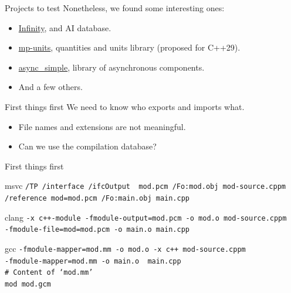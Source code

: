 \documentclass[aspectratio=169]{beamer}
\begin{document}
\begin{frame}{Projects to test}
  Nonetheless, we found some interesting ones:
  \begin{itemize}
    \item \href{https://github.com/infiniflow/infinity}{Infinity}, and AI database.
    \item \href{https://github.com/mpusz/mp-units}{mp-units}, quantities and units library (proposed for C++29).
    \item \href{https://github.com/alibaba/async_simple/tree/CXX20Modules}{async\_simple}, library of asynchronous components.
    \item And a few others.
  \end{itemize}
\end{frame}

\begin{frame}{First things first}
  We need to know who exports and imports what.
  \begin{itemize}
    \item File names and extensions are not meaningful.
    \item Can we use the compilation database?
  \end{itemize}
\end{frame}

\begin{frame}{First things first}
  \begin{block}{msvc }
    \footnotesize{
    \texttt{/TP /interface /ifcOutput {\color{red} mod.pcm} /Fo:mod.obj {\color{blue}mod-source.cppm}} \\
    \texttt{/reference {\color{purple}mod=mod.pcm} /Fo:main.obj {\color{blue}main.cpp}}
    }
  \end{block}
  \begin{block}{clang }
    \footnotesize{
    \texttt{-x c++-module -fmodule-output={\color{red}mod.pcm} -o mod.o {\color{blue}mod-source.cppm}} \\
    \texttt{-fmodule-file={\color{purple}mod=mod.pcm} -o main.o {\color{blue}main.cpp}}
    }
  \end{block}
  \begin{block}{gcc }
    \footnotesize{
    \texttt{-fmodule-mapper={\color{magenta}mod.mm} -o mod.o -x c++ {\color{blue}mod-source.cppm}} \\
    \texttt{-fmodule-mapper={\color{magenta}mod.mm} -o main.o {\color{blue} main.cpp}} \\
    {\color{teal}\texttt{\# Content of `mod.mm'}} \\
    \texttt{mod mod.gcm}
    }
  \end{block}
\end{frame}
\end{document}
